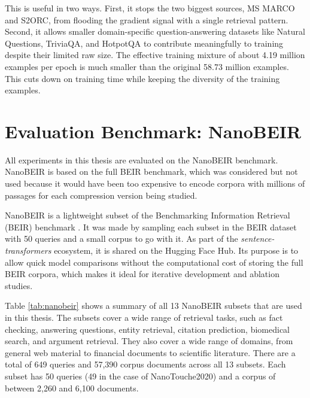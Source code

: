 This is useful in two ways. First, it stops the two biggest sources, MS MARCO and S2ORC, from flooding the gradient signal with a single retrieval pattern. Second, it allows smaller domain-specific question-answering datasets like Natural Questions, TriviaQA, and HotpotQA to contribute meaningfully to training despite their limited raw size. The effective training mixture of about 4.19 million examples per epoch is much smaller than the original 58.73 million examples. This cuts down on training time while keeping the diversity of the training examples.

\section{Evaluation Benchmark: NanoBEIR}

All experiments in this thesis are evaluated on the NanoBEIR benchmark. NanoBEIR is based on the full BEIR benchmark, which was considered but not used because it would have been too expensive to encode corpora with millions of passages for each compression version being studied.

NanoBEIR \cite{nanobeir2024} is a lightweight subset of the Benchmarking Information Retrieval (BEIR) benchmark \cite{thakur2021beir}. It was made by sampling each subset in the BEIR dataset with 50 queries and a small corpus to go with it. As part of the \textit{sentence-transformers} ecosystem, it is shared on the Hugging Face Hub. Its purpose is to allow quick model comparisons without the computational cost of storing the full BEIR corpora, which makes it ideal for iterative development and ablation studies.

Table \ref{tab:nanobeir} shows a summary of all 13 NanoBEIR subsets that are used in this thesis. The subsets cover a wide range of retrieval tasks, such as fact checking, answering questions, entity retrieval, citation prediction, biomedical search, and argument retrieval. They also cover a wide range of domains, from general web material to financial documents to scientific literature. There are a total of 649 queries and 57,390 corpus documents across all 13 subsets. Each subset has 50 queries (49 in the case of NanoTouche2020) and a corpus of between 2,260 and 6,100 documents.

